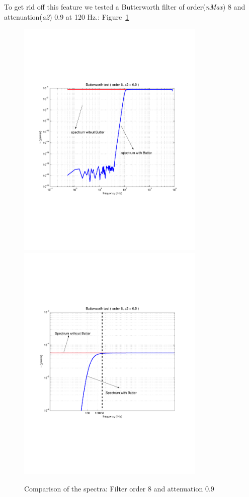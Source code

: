To get rid off this feature we tested a Butterworth filter of 
order(\emph{nMax}) 8 and attenuation(\emph{a2}) 0.9 at 120 Hz.: 
Figure~\ref{fig:testattenuation8_9}
\begin{figure}
\centering
\includegraphics[width=0.8\textwidth]{figures/testattenuation8_9}
\includegraphics[width=0.8\textwidth]{figures/testattenuation8_9zoomed}
\caption{Comparison of the spectra: Filter order 8 and attenuation 0.9}
\label{fig:testattenuation8_9}
\end{figure}

